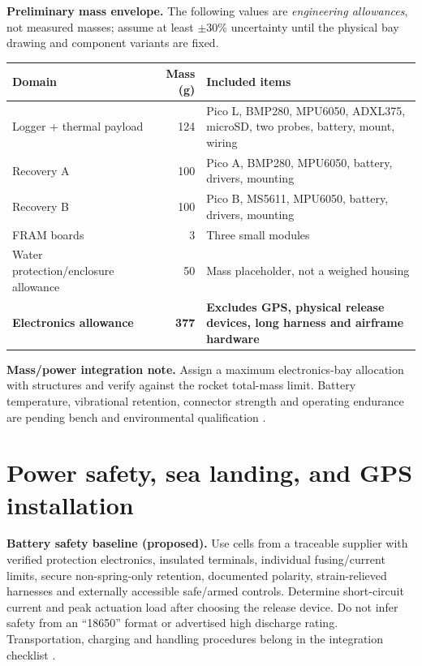 \textbf{Preliminary mass envelope.} The following values are \emph{engineering allowances}, not measured masses; assume at least $\pm30\%$ uncertainty until the physical bay drawing and component variants are fixed.
\par\medskip
\small
{}
\begin{tabularx}{\linewidth}{@{}L{45mm}r Y@{}}
\toprule{}\textbf{Domain}&\textbf{Mass (g)}&\textbf{Included items}\\\midrule
Logger + thermal payload & 124 & Pico L, BMP280, MPU6050, ADXL375, microSD, two probes, battery, mount, wiring\\
Recovery A & 100 & Pico A, BMP280, MPU6050, battery, drivers, mounting\\
Recovery B & 100 & Pico B, MS5611, MPU6050, battery, drivers, mounting\\
FRAM boards & 3 & Three small modules\\
Water protection/enclosure allowance & 50 & Mass placeholder, not a weighed housing\\
\midrule
\textbf{Electronics allowance} & \textbf{377} & \textbf{Excludes GPS, physical release devices, long harness and airframe hardware}\\
\bottomrule
\end{tabularx}\par
\normalsize

\textbf{Mass/power integration note.} Assign a maximum electronics-bay allocation with structures and verify against the rocket total-mass limit. Battery temperature, vibrational retention, connector strength and operating endurance are pending bench and environmental qualification \cite{rtc2027app03,rtc2027app08}.


\section{Power safety, sea landing, and GPS installation}
\label{sec:splash}
\textbf{Battery safety baseline (proposed).} Use cells from a traceable supplier with verified protection electronics, insulated terminals, individual fusing/current limits, secure non-spring-only retention, documented polarity, strain-relieved harnesses and externally accessible safe/armed controls. Determine short-circuit current and peak actuation load after choosing the release device. Do not infer safety from an ``18650'' format or advertised high discharge rating. Transportation, charging and handling procedures belong in the integration checklist \cite{rtc2027app03}.

